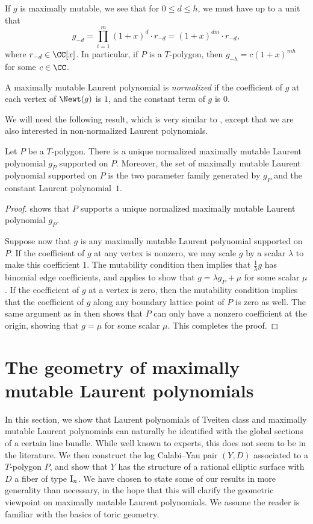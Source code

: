 If $g$ is maximally mutable, we see that for $0 \leq d \leq h$, we must have up to a unit that
	\[
	g_{-d}=\prod_{i=1}^m (1+x)^{d} \cdot r_{-d}=(1+x)^{dm} \cdot r_{-d},
	\]
	where $r_{-d} \in \CC[x]$. In particular, if $P$ is a $T$-polygon, then $g_{-h}=c(1+x)^{mh}$ for some $c \in \CC$.
		\begin{Definition}\label{def:normalized}
		A maximally mutable Laurent polynomial is \emph{normalized} if the coefficient of $g$ at each vertex of $\Newt(g)$ is $1$, and the constant term of $g$ is $0$.
	\end{Definition}
We will need the following result, which is very similar to \cite[Proposition 3.7]{Coates2021}, except that we are also interested in non-normalized Laurent polynomials.
\begin{Theorem}\label{thm:MMLP}
	Let $P$ be a $T$-polygon. There is a unique normalized maximally mutable Laurent polynomial $g_P$ supported on $P$. Moreover, the set of maximally mutable Laurent polynomial supported on $P$ is the two parameter family generated by $g_P$ and
	the constant Laurent polynomial~$1$.
\end{Theorem}
\begin{proof}
\cite[Proposition 3.7]{Coates2021} shows that $P$ supports a unique normalized maximally mutable Laurent polynomial $g_P$.

Suppose now that $g$ is any maximally mutable Laurent polynomial supported on $P$. If the coefficient of $g$ at any vertex is nonzero, we may scale $g$ by a scalar $\lambda$ to make this coefficient $1$. The mutability condition then implies that $\tfrac{1}{\lambda}g$ has binomial edge coefficients, and \cite[Proposition~3.7]{Coates2021} applies to show that $g=\lambda g_P+\mu$ for some scalar $\mu$.
If the coefficient of $g$ at a vertex is zero, then the mutability condition implies that the coefficient of $g$ along any boundary lattice point of $P$ is zero as well. The same argument as in \cite[Proposition 3.7]{Coates2021} then shows that $P$ can only have a nonzero coefficient at the origin, showing that $g=\mu$ for some scalar $\mu$. This completes the proof.
\end{proof}

	\section{The geometry of maximally mutable Laurent polynomials}\label{sec:geometry}
In this section, we show that Laurent polynomials of Tveiten class and maximally mutable Laurent polynomials can naturally be identified with the global sections of a certain line bundle. While well known to experts, this does not seem to be in the literature.
We then construct the log Calabi--Yau pair $(Y, D)$ associated to a $T$-polygon $P$, and show that $Y$ has the structure of a rational elliptic surface with $D$ a fiber of type ${\rm I}_n$. We have chosen to state some of our results in more generality than necessary, in the hope that this will clarify the geometric viewpoint on maximally mutable Laurent polynomials. We assume the reader is familiar with the basics of toric geometry.

